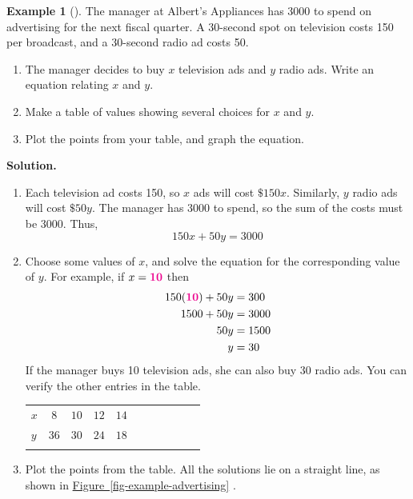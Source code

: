 \documentclass[10pt,]{book}
\theoremstyle{plain}
\theoremstyle{definition}
\theoremstyle{definition}
\newtheorem{example}[theorem]{Example}
\theoremstyle{definition}
\theoremstyle{definition}
\numberwithin{equation}{part}
\newcommand{\hrulethin}  {\noalign{\hrule height 0.04em}}
\newcommand{\hrulethick} {\noalign{\hrule height 0.11em}}
\newcommand{\alert}[1]{\boldsymbol{\color{magenta}{#1}}}
\newcommand{\amp}{&}
\begin{document}
\begin{example}[]\label{example-advertising}
The manager at Albert's Appliances has \textdollar{}3000 to spend on advertising for the next fiscal quarter.  A 30-second spot on television costs \textdollar{}150 per broadcast, and a 30-second radio ad costs \textdollar{}50.%
\leavevmode%
\begin{enumerate}[label=\alph*]
\item\hypertarget{li-54}{}The manager decides to buy \(x\) television ads and \(y\) radio ads.  Write an equation relating \(x\) and \(y\).%
\item\hypertarget{li-55}{}Make a table of values showing several choices for \(x\) and \(y\).%
\item\hypertarget{li-56}{}Plot the points from your table, and graph the equation.%
\end{enumerate}
\par\medskip\noindent%
\textbf{Solution.}\quad \leavevmode%
\begin{enumerate}[label=\alph*]
\item\hypertarget{li-57}{}Each television ad costs \textdollar{}150, so \(x\) ads will cost \(\$150x\).  Similarly, \(y\) radio ads will cost \(\$50y\).  The manager has \textdollar{}3000 to spend, so the sum of the costs must be \textdollar{}3000.  Thus,%
\begin{equation*}
150x+50y=3000
\end{equation*}
%
\item\hypertarget{li-58}{}Choose some values of \(x\), and solve the equation for the corresponding value of \(y\).  For example, if \(x=\alert{10}\) then%
\begin{align*}
150(\alert{10})+50y\amp=300\\
1500+50y\amp=3000\\
50y\amp=1500\\
y\amp=30
\end{align*}
If the manager buys 10 television ads, she can also buy 30 radio ads.  You can verify the other entries in the table.%
\begin{table}
\centering
\begin{tabular}{AcAcAcAcAcA}\hrulethick
\(x\)&\(8\)&\(10\)&\(12\)&\(14\)\tabularnewline\hrulethin
\(y\)&\(36\)&\(30\)&\(24\)&\(18\)\tabularnewline\hrulethin
\end{tabular}
\end{table}
\item\hypertarget{li-59}{}Plot the points from the table.  All the solutions lie on a straight line, as shown in \hyperref[fig-example-advertising]{Figure~\ref{fig-example-advertising}} . \begin{figure}

\end{figure}
\end{enumerate}
\end{example}
\end{document}
